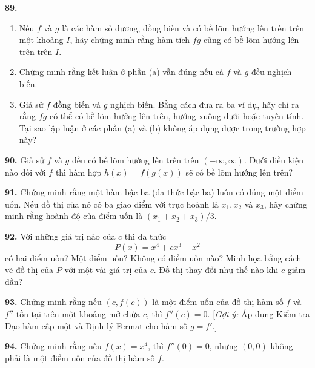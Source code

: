 \begin{minipage}[t]{0.485\textwidth}
\vspace{1.8mm}
\textbf{89.}
\begin{enumerate}[label=(\alph*), itemsep=0.5pt, topsep=1.5pt, parsep=0pt, leftmargin=1.5em]
    \item Nếu $f$ và $g$ là các hàm số dương, đồng biến và có bề lõm hướng lên trên trên một khoảng $I$, hãy chứng minh rằng hàm tích $fg$ cũng có bề lõm hướng lên trên trên $I$.
    \item Chứng minh rằng kết luận ở phần (a) vẫn đúng nếu cả $f$ và $g$ đều nghịch biến.
    \item Giả sử $f$ đồng biến và $g$ nghịch biến. Bằng cách đưa ra ba ví dụ, hãy chỉ ra rằng $fg$ có thể có bề lõm hướng lên trên, hướng xuống dưới hoặc tuyến tính. Tại sao lập luận ở các phần (a) và (b) không áp dụng được trong trường hợp này?
\end{enumerate}

\vspace{1.8mm}
\textbf{90.} Giả sử $f$ và $g$ đều có bề lõm hướng lên trên trên $(-\infty, \infty)$. Dưới điều kiện nào đối với $f$ thì hàm hợp $h(x) = f(g(x))$ sẽ có bề lõm hướng lên trên?

\vspace{2.2mm}
\noindent{\color{stewartcyan}\rule{\linewidth}{0.65pt}}
\vspace{1.5mm}

\textbf{91.} Chứng minh rằng một hàm bậc ba (đa thức bậc ba) luôn có đúng một điểm uốn. Nếu đồ thị của nó có ba giao điểm với trục hoành là $x_1, x_2$ và $x_3$, hãy chứng minh rằng hoành độ của điểm uốn là $(x_1 + x_2 + x_3)/3$.

\vspace{2mm}
\noindent\makebox[0pt][r]{\casicon\hspace{4pt}}\textbf{92.} Với những giá trị nào của $c$ thì đa thức
\[
P(x) = x^4 + cx^3 + x^2
\]
có hai điểm uốn? Một điểm uốn? Không có điểm uốn nào? Minh họa bằng cách vẽ đồ thị của $P$ với một vài giá trị của $c$. Đồ thị thay đổi như thế nào khi $c$ giảm dần?

\vspace{2mm}
\textbf{93.} Chứng minh rằng nếu $(c, f(c))$ là một điểm uốn của đồ thị hàm số $f$ và $f''$ tồn tại trên một khoảng mở chứa $c$, thì $f''(c) = 0$. [\textit{Gợi ý:} Áp dụng Kiểm tra Đạo hàm cấp một và Định lý Fermat cho hàm số $g = f'$.]

\vspace{2mm}
\textbf{94.} Chứng minh rằng nếu $f(x) = x^4$, thì $f''(0) = 0$, nhưng $(0, 0)$ không phải là một điểm uốn của đồ thị hàm số $f$.
\end{minipage}
